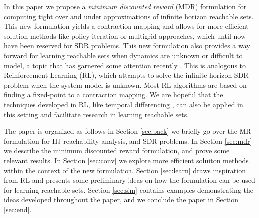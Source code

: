 In this paper we propose a \emph{minimum discounted reward} (MDR) formulation for computing tight over and under approximations of infinite horizon reachable sets. This new formulation yields a contraction mapping and allows for more efficient solution methods like policy iteration or multigrid approaches, which until now have been reserved for SDR problems. This new formulation also provides a way forward for learning reachable sets when dynamics are unknown or difficult to model, a topic that has garnered some attention recently \cite{Akametalu2014,Akametalu2015,Allen2014,Djeridane2006,Gillula2012a,Royo2016}. This is analogous to Reinforcement Learning (RL), which attempts to solve the infinite horizon SDR problem when the system model is unknown. Most RL algorithms are based on finding a fixed-point to a contraction mapping. We are hopeful that the techniques developed in RL, like temporal differencing \cite{Sutton1988}, can also be applied in this setting and facilitate research in learning reachable sets.


The paper is organized as follows in Section \ref{sec:back} we briefly go over the MR formulation for HJ reachability analysis, and SDR problems. In Section \ref{sec:mdr} we describe the minimum discounted  reward formulation, and prove some relevant results. In Section \ref{sec:conv} we explore more efficient soluiton methods within the context of the new formulation. Section \ref{sec:learn} draws inspiration from RL and presents some preliminary ideas on how the formulation can be used for learning reachable sets. Section \ref{sec:sim} contains examples demonstrating the ideas developed throughout the paper, and we conclude the paper in Section \ref{sec:end}.



